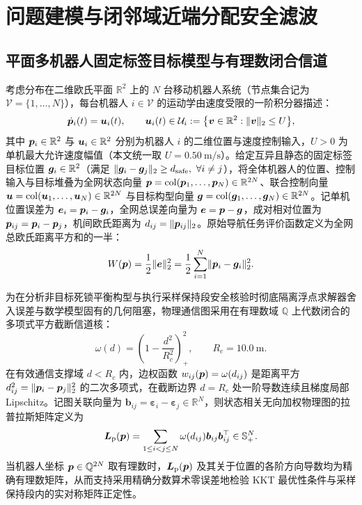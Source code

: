\section{问题建模与闭邻域近端分配安全滤波}\label{sec:model}

\subsection{平面多机器人固定标签目标模型与有理数闭合信道}
考虑分布在二维欧氏平面 $\mathbb R^2$ 上的 $N$ 台移动机器人系统（节点集合记为 $\mathcal V=\{1,\dots,N\}$），每台机器人 $i\in\mathcal V$ 的运动学由速度受限的一阶积分器描述：
\begin{equation}
 \dot{\boldsymbol{p}}_i(t)=\boldsymbol{u}_i(t),\qquad \boldsymbol{u}_i(t)\in\mathcal U_i:=\big\{\boldsymbol v\in\mathbb R^2:\lVert\boldsymbol v\rVert_2\le U\big\},
 \label{eq:kinematics}
\end{equation}
其中 $\boldsymbol{p}_i\in\mathbb R^2$ 与 $\boldsymbol{u}_i\in\mathbb R^2$ 分别为机器人 $i$ 的二维位置与速度控制输入，$U>0$ 为单机最大允许速度幅值（本文统一取 $U=0.50\ \mathrm{m/s}$）。给定互异且静态的固定标签目标位置 $\boldsymbol{g}_i\in\mathbb R^2$（满足 $\lVert\boldsymbol{g}_i-\boldsymbol{g}_j\rVert_2\ge d_{\mathrm{safe}},\ \forall i\ne j$），将全体机器人的位置、控制输入与目标堆叠为全网状态向量 $\boldsymbol{p}=\operatorname{col}(\boldsymbol{p}_1,\dots,\boldsymbol{p}_N)\in\mathbb R^{2N}$、联合控制向量 $\boldsymbol{u}=\operatorname{col}(\boldsymbol{u}_1,\dots,\boldsymbol{u}_N)\in\mathbb R^{2N}$ 与目标构型向量 $\boldsymbol{g}=\operatorname{col}(\boldsymbol{g}_1,\dots,\boldsymbol{g}_N)\in\mathbb R^{2N}$。记单机位置误差为 $\boldsymbol{e}_i=\boldsymbol{p}_i-\boldsymbol{g}_i$，全网总误差向量为 $\boldsymbol{e}=\boldsymbol{p}-\boldsymbol{g}$，成对相对位置为 $\boldsymbol{p}_{ij}=\boldsymbol{p}_i-\boldsymbol{p}_j$，机间欧氏距离为 $d_{ij}=\lVert\boldsymbol{p}_{ij}\rVert_2$。原始导航任务评价函数定义为全网总欧氏距离平方和的一半：
\begin{equation}
 W(\boldsymbol{p})=\frac12\lVert\boldsymbol{e}\rVert_2^2=\frac12\sum_{i=1}^N\lVert\boldsymbol{p}_i-\boldsymbol{g}_i\rVert_2^2.
 \label{eq:W-def}
\end{equation}

为在分析非目标死锁平衡构型与执行采样保持段安全核验时彻底隔离浮点求解器舍入误差与数学模型固有的几何阻塞，物理通信图采用在有理数域 $\mathbb Q$ 上代数闭合的多项式平方截断信道核：
\begin{equation}
 \omega(d)=\left(1-\frac{d^2}{R_c^2}\right)_+^2,\qquad R_c=10.0\ \mathrm m.
 \label{eq:poly-channel}
\end{equation}
在有效通信支撑域 $d<R_c$ 内，边权函数 $w_{ij}(\boldsymbol{p})=\omega(d_{ij})$ 是距离平方 $d_{ij}^2=\lVert\boldsymbol{p}_i-\boldsymbol{p}_j\rVert_2^2$ 的二次多项式，在截断边界 $d=R_c$ 处一阶导数连续且梯度局部 Lipschitz。记图关联向量为 $\boldsymbol b_{ij}=\boldsymbol\varepsilon_i-\boldsymbol\varepsilon_j\in\mathbb R^N$，则状态相关无向加权物理图的拉普拉斯矩阵定义为
\begin{equation}
 \boldsymbol{L}_{\mathrm{p}}(\boldsymbol{p})=\sum_{1\le i<j\le N}\omega(d_{ij})\boldsymbol b_{ij}\boldsymbol b_{ij}^{\top}\in\mathbb S_+^N.
 \label{eq:laplacian}
\end{equation}
当机器人坐标 $\boldsymbol{p}\in\mathbb Q^{2N}$ 取有理数时，$\boldsymbol{L}_{\mathrm{p}}(\boldsymbol{p})$ 及其关于位置的各阶方向导数均为精确有理数矩阵，从而支持采用精确分数算术零误差地检验 KKT 最优性条件与采样保持段内的实对称矩阵正定性。

